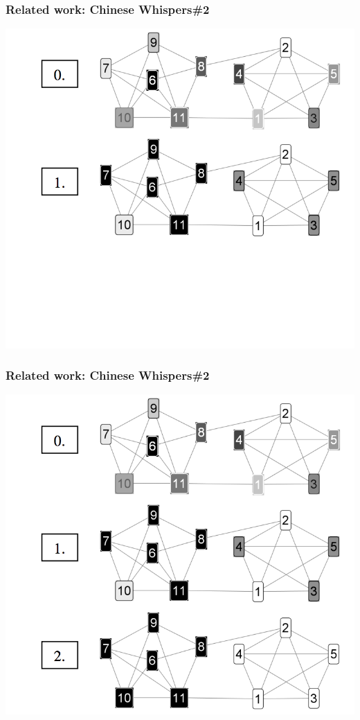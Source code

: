 \documentclass[usenames,dvipsnames]{beamer}
\begin{document}
\begin{frame}[fragile]
\frametitle{Related work: Chinese Whispers\#2}
\begin{center}
 \includegraphics[height=0.59\textwidth]{cw2-2}
 
 \end{center}
\end{frame}

\begin{frame}[fragile]
\frametitle{Related work: Chinese Whispers\#2}
\begin{center}
 \includegraphics[height=0.59\textwidth]{cw2}
 
 \end{center}
\end{frame}
\end{document}
